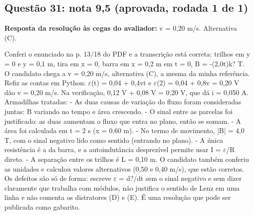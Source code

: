 \documentclass{article}%
\begin{document}
\subsection*{Questão 31: nota 9,5 (aprovada, rodada 1 de 1)}%
\textbf{Resposta da resolução às cegas do avaliador:} v = 0,20 m/s. Alternativa (C).\par %
Conferi o enunciado na p. 13/18 do PDF e a transcrição está correta: trilhos em y = 0 e y = 0,1 m, tira em x = 0, barra em x = 0,2 m em t = 0, B = -(2,0t)k? T. O candidato chega a v = 0,20 m/s, alternativa (C), a mesma da minha referência. Refiz as contas em Python: $\varepsilon$(t) = 0,04 + 0,4vt e $\varepsilon$(2) = 0,04 + 0,8v = 0,20 V dão v = 0,20 m/s. Na verificação, 0,12 V + 0,08 V = 0,20 V, que dá i = 0,050 A.\newline%
\newline%
Armadilhas tratadas:\newline%
{-} As duas causas de variação do fluxo foram consideradas juntas: B variando no tempo e área crescendo.\newline%
{-} O sinal entre as parcelas foi justificado: as duas aumentam o fluxo que entra no plano, então se somam.\newline%
{-} A área foi calculada em t = 2 s (x = 0,60 m).\newline%
{-} No termo de movimento, |B| = 4,0 T, com o sinal negativo lido como sentido (entrando no plano).\newline%
{-} A única resistência é a da barra, e a autoindutância desprezível permite usar I = $\varepsilon$/R direto.\newline%
{-} A separação entre os trilhos é L = 0,10 m.\newline%
\newline%
O candidato também conferiu as unidades e calculou valores alternativos (0,50 e 0,40 m/s), que estão corretos. Os defeitos são só de forma: escreve $\varepsilon$ = d?/dt sem o sinal negativo e sem dizer claramente que trabalha com módulos, não justifica o sentido de Lenz em uma linha e não comenta os distratores (D) e (E). É uma resolução que pode ser publicada como gabarito.%
\end{document}
